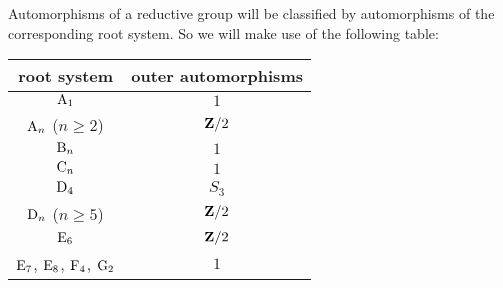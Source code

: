 Automorphisms of a reductive group will be classified by automorphisms of the 
corresponding root system. So we will make use of the following table:
\begin{center}
\begin{tabular}{c|c}
  root system                 & outer automorphisms \\ \hline
  $\mathrm{A}_1$                  & $1$ \\
  $\mathrm{A}_n$ ($n\geqslant 2$) & $\mathbf{Z}/2$  \\
  $\mathrm{B}_n$                  & $1$ \\
  $\mathrm{C}_n$                  & $1$ \\
  $\mathrm{D}_4$                  & $S_3$ \\
  $\mathrm{D}_n$ ($n\geqslant 5$) & $\mathbf{Z}/2$ \\
  $\mathrm{E}_6$                  & $\mathbf{Z}/2$ \\
  $\mathrm{E}_7$, $\mathrm{E}_8$, $\mathrm{F}_4$, $\mathrm{G}_2$ & $1$
\end{tabular}
\end{center}




